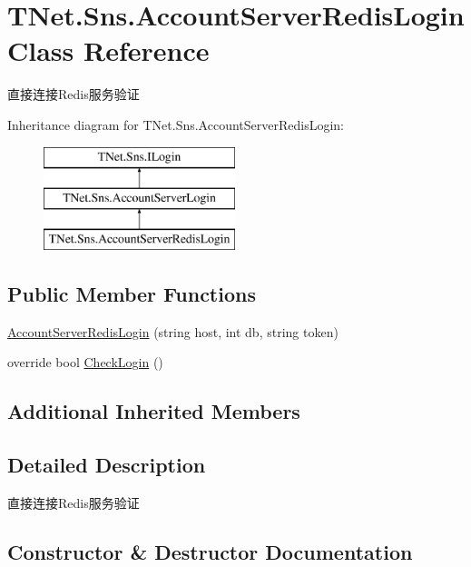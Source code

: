 \hypertarget{class_t_net_1_1_sns_1_1_account_server_redis_login}{}\section{T\+Net.\+Sns.\+Account\+Server\+Redis\+Login Class Reference}
\label{class_t_net_1_1_sns_1_1_account_server_redis_login}


直接连接\+Redis服务验证  


Inheritance diagram for T\+Net.\+Sns.\+Account\+Server\+Redis\+Login\+:\begin{figure}[H]
\begin{center}
\leavevmode
\includegraphics[height=3.000000cm]{class_t_net_1_1_sns_1_1_account_server_redis_login}
\end{center}
\end{figure}
\subsection*{Public Member Functions}
\begin{DoxyCompactItemize}
\item 
\mbox{\hyperlink{class_t_net_1_1_sns_1_1_account_server_redis_login_aa083b688dca22616201c082976f4f19b}{Account\+Server\+Redis\+Login}} (string host, int db, string token)
\item 
override bool \mbox{\hyperlink{class_t_net_1_1_sns_1_1_account_server_redis_login_a717e47c6c6203a793613cf8646701168}{Check\+Login}} ()
\end{DoxyCompactItemize}
\subsection*{Additional Inherited Members}


\subsection{Detailed Description}
直接连接\+Redis服务验证 



\subsection{Constructor \& Destructor Documentation}
\mbox{\label{class_t_net_1_1_sns_1_1_account_server_redis_login_aa083b688dca22616201c082976f4f19b}} 
